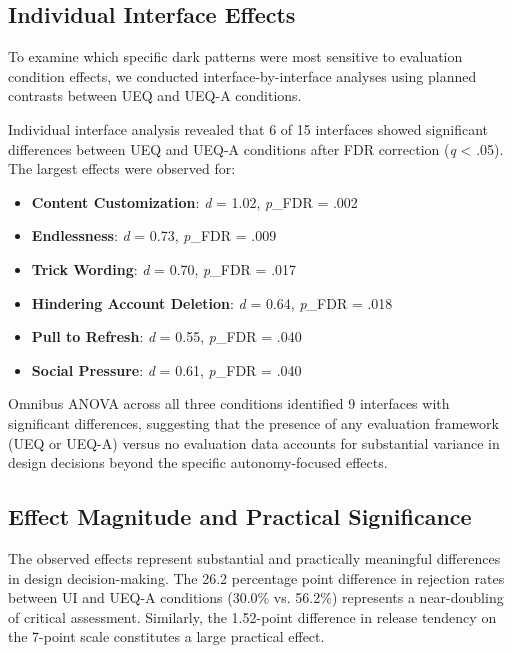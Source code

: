 \subsection{Individual Interface Effects}

To examine which specific dark patterns were most sensitive to evaluation condition effects, we conducted interface-by-interface analyses using planned contrasts between UEQ and UEQ-A conditions.

Individual interface analysis revealed that 6 of 15 interfaces showed significant differences between UEQ and UEQ-A conditions after FDR correction (\textit{q} < .05). The largest effects were observed for:

\begin{itemize}
\item \textbf{Content Customization}: \textit{d} = 1.02, \textit{p}_{FDR} = .002
\item \textbf{Endlessness}: \textit{d} = 0.73, \textit{p}_{FDR} = .009  
\item \textbf{Trick Wording}: \textit{d} = 0.70, \textit{p}_{FDR} = .017
\item \textbf{Hindering Account Deletion}: \textit{d} = 0.64, \textit{p}_{FDR} = .018
\item \textbf{Pull to Refresh}: \textit{d} = 0.55, \textit{p}_{FDR} = .040
\item \textbf{Social Pressure}: \textit{d} = 0.61, \textit{p}_{FDR} = .040
\end{itemize}

Omnibus ANOVA across all three conditions identified 9 interfaces with significant differences, suggesting that the presence of any evaluation framework (UEQ or UEQ-A) versus no evaluation data accounts for substantial variance in design decisions beyond the specific autonomy-focused effects.

\subsection{Effect Magnitude and Practical Significance}

The observed effects represent substantial and practically meaningful differences in design decision-making. The 26.2 percentage point difference in rejection rates between UI and UEQ-A conditions (30.0\% vs. 56.2\%) represents a near-doubling of critical assessment. Similarly, the 1.52-point difference in release tendency on the 7-point scale constitutes a large practical effect.

